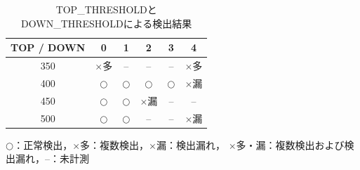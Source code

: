 \begin{table}[htbp]
  \centering
  \caption{TOP\_THRESHOLDとDOWN\_THRESHOLDによる検出結果}
  \label{tab:threshold_results}

  \setlength{\tabcolsep}{12pt}
  \renewcommand{\arraystretch}{1.5}

  \begin{tabular}{c|ccccc}
    \hline
    TOP / DOWN & 0          & 1          & 2          & 3          & 4         \\
    \hline
    350        & $\times$多  & --         & --         & --         & $\times$多 \\
    400        & $\bigcirc$ & $\bigcirc$ & $\bigcirc$ & $\bigcirc$ & $\times$漏 \\
    450        & $\bigcirc$ & $\bigcirc$ & $\times$漏  & --         & --        \\
    500        & $\bigcirc$ & $\bigcirc$ & --         & --         & $\times$漏 \\
    \hline
  \end{tabular}

  \vspace{1ex}

  \footnotesize
  $\bigcirc$：正常検出，$\times$多：複数検出，$\times$漏：検出漏れ，
  $\times$多・漏：複数検出および検出漏れ，--：未計測
\end{table}

